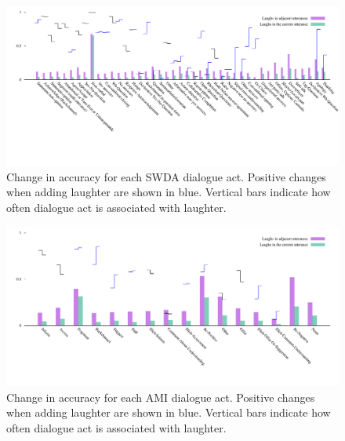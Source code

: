 \documentclass[11pt,a4paper]{article}
\begin{document}




\begin{figure}
  \centering
  \includegraphics[width=\textwidth]{img/SWDA-bertLvsNL.pdf}
  \caption{Change in accuracy for each SWDA dialogue act. Positive changes when adding laughter are shown in blue. Vertical bars indicate how often dialogue act is associated with laughter.}
    \label{fig:swda-by-da}
\end{figure}

\begin{figure}
  \label{fig:ami-by-da}
  \centering
  \includegraphics[width=\textwidth]{img/AMI-DA-bertLvsNL.pdf}
  \caption{Change in accuracy for each AMI dialogue act. Positive changes when adding laughter are shown in blue. Vertical bars indicate how often dialogue act is associated with laughter.}
\end{figure}
\end{document}
